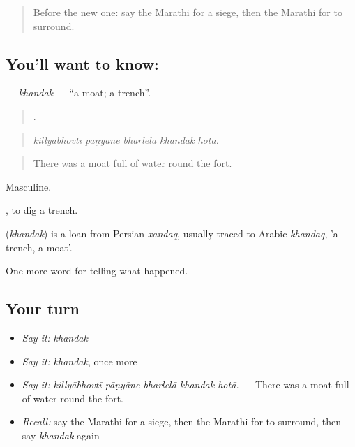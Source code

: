 \label{lesson:MR-C331-khandak}



\begin{quote}
Before the new one: say the Marathi for a siege, then the Marathi for to surround.
\end{quote}

\subsection*{You'll want to know: }
\textbf{} — \emph{khandak} — \textquotedblleft{}a moat; a trench\textquotedblright{}.

\begin{quote}
    .
\end{quote}

\begin{quote}
\emph{killyābhovtī pāṇyāne bharlelā khandak hotā.}
\end{quote}

\begin{quote}
There was a moat full of water round the fort.
\end{quote}

Masculine.

 , to dig a trench.

\begin{cousinweb}
\textbf{} (\emph{khandak}) is a loan from Persian \emph{xandaq}, usually traced to Arabic \emph{khandaq}, 'a trench, a moat'.
\end{cousinweb}

\begin{grammarlens}[title={What you've built}]
One more word for telling what happened.
\end{grammarlens}

\subsection*{Your turn}
\begin{itemize}
\raggedright
  \item \emph{Say it:} \emph{khandak}
  \item \emph{Say it:} \emph{khandak}, once more
  \item \emph{Say it:} \emph{killyābhovtī pāṇyāne bharlelā khandak hotā.} — There was a moat full of water round the fort.
  \item \emph{Recall:} say the Marathi for a siege, then the Marathi for to surround, then say \emph{khandak} again
\end{itemize}

